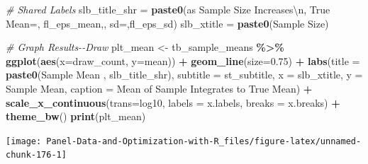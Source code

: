 \documentclass[
]{book}
\newenvironment{Shaded}{\begin{snugshade}}{\end{snugshade}}
\newcommand{\CharTok}[1]{\textcolor[rgb]{0.31,0.60,0.02}{#1}}
\newcommand{\CommentTok}[1]{\textcolor[rgb]{0.56,0.35,0.01}{\textit{#1}}}
\newcommand{\DataTypeTok}[1]{\textcolor[rgb]{0.13,0.29,0.53}{#1}}
\newcommand{\FloatTok}[1]{\textcolor[rgb]{0.00,0.00,0.81}{#1}}
\newcommand{\KeywordTok}[1]{\textcolor[rgb]{0.13,0.29,0.53}{\textbf{#1}}}
\newcommand{\NormalTok}[1]{#1}
\newcommand{\OperatorTok}[1]{\textcolor[rgb]{0.81,0.36,0.00}{\textbf{#1}}}
\newcommand{\StringTok}[1]{\textcolor[rgb]{0.31,0.60,0.02}{#1}}
\begin{document}
\begin{Shaded}
\begin{Highlighting}[]
\CommentTok{\# Shared Labels}
\NormalTok{slb\_title\_shr =}\StringTok{ }\KeywordTok{paste0}\NormalTok{(}\StringTok{\textquotesingle{}as Sample Size Increases}\CharTok{\textbackslash{}n}\StringTok{\textquotesingle{}}\NormalTok{,}
                       \StringTok{\textquotesingle{}True Mean=\textquotesingle{}}\NormalTok{, fl\_eps\_mean,}\StringTok{\textquotesingle{}, sd=\textquotesingle{}}\NormalTok{,fl\_eps\_sd)}
\NormalTok{slb\_xtitle =}\StringTok{ }\KeywordTok{paste0}\NormalTok{(}\StringTok{\textquotesingle{}Sample Size\textquotesingle{}}\NormalTok{)}

\CommentTok{\# Graph Results{-}{-}Draw}
\NormalTok{plt\_mean \textless{}{-}}\StringTok{ }\NormalTok{tb\_sample\_means }\OperatorTok{\%\textgreater{}\%}
\StringTok{  }\KeywordTok{ggplot}\NormalTok{(}\KeywordTok{aes}\NormalTok{(}\DataTypeTok{x=}\NormalTok{draw\_count, }\DataTypeTok{y=}\NormalTok{mean)) }\OperatorTok{+}
\StringTok{  }\KeywordTok{geom\_line}\NormalTok{(}\DataTypeTok{size=}\FloatTok{0.75}\NormalTok{) }\OperatorTok{+}
\StringTok{  }\KeywordTok{labs}\NormalTok{(}\DataTypeTok{title =} \KeywordTok{paste0}\NormalTok{(}\StringTok{\textquotesingle{}Sample Mean \textquotesingle{}}\NormalTok{, slb\_title\_shr),}
       \DataTypeTok{subtitle =}\NormalTok{ st\_subtitle,}
       \DataTypeTok{x =}\NormalTok{ slb\_xtitle,}
       \DataTypeTok{y =} \StringTok{\textquotesingle{}Sample Mean\textquotesingle{}}\NormalTok{,}
       \DataTypeTok{caption =} \StringTok{\textquotesingle{}Mean of Sample Integrates to True Mean\textquotesingle{}}\NormalTok{) }\OperatorTok{+}
\StringTok{  }\KeywordTok{scale\_x\_continuous}\NormalTok{(}\DataTypeTok{trans=}\StringTok{\textquotesingle{}log10\textquotesingle{}}\NormalTok{, }\DataTypeTok{labels =}\NormalTok{ x.labels, }\DataTypeTok{breaks =}\NormalTok{ x.breaks) }\OperatorTok{+}
\StringTok{  }\KeywordTok{theme\_bw}\NormalTok{()}
\KeywordTok{print}\NormalTok{(plt\_mean)}
\end{Highlighting}
\end{Shaded}

\begin{center}\texttt{[image: Panel-Data-and-Optimization-with-R\_files/figure-latex/unnamed-chunk-176-1]} \end{center}
\end{document}
